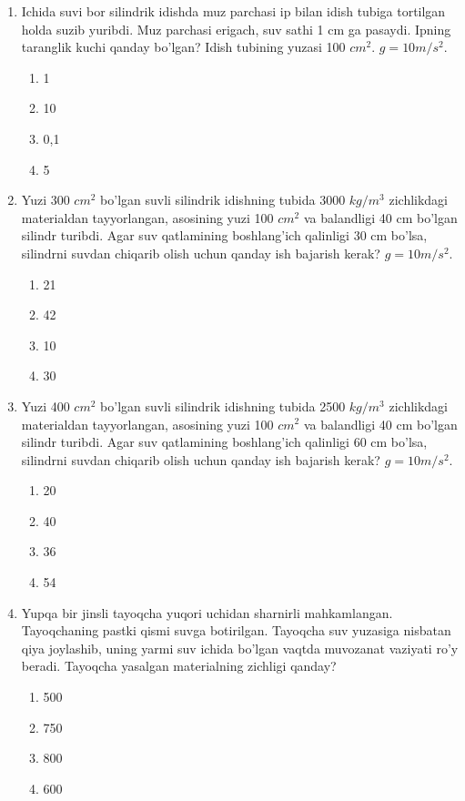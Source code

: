 \begin{enumerate}
\item Ichida suvi bor silindrik idishda muz parchasi ip bilan idish tubiga tortilgan holda suzib yuribdi. Muz parchasi erigach, suv sathi 1 cm ga pasaydi. Ipning taranglik kuchi qanday bo'lgan? Idish tubining yuzasi 100 $cm^2$. $g=10m/s^2$.
\begin{enumerate}[label=\Alph*)]
\item 1
\item 10
\item 0,1
\item 5
\end{enumerate}

\item Yuzi 300 $cm^2$ bo'lgan suvli silindrik idishning tubida 3000 $kg/m^3$ zichlikdagi materialdan tayyorlangan, asosining yuzi 100 $cm^2$ va balandligi 40 cm bo'lgan silindr turibdi. Agar suv qatlamining boshlang'ich qalinligi 30 cm bo'lsa, silindrni suvdan chiqarib olish uchun qanday ish bajarish kerak? $g=10m/s^2$.
\begin{enumerate}[label=\Alph*)]
\item 21
\item 42
\item 10
\item 30
\end{enumerate}

\item Yuzi 400 $cm^2$ bo'lgan suvli silindrik idishning tubida 2500 $kg/m^3$ zichlikdagi materialdan tayyorlangan, asosining yuzi 100 $cm^2$ va balandligi 40 cm bo'lgan silindr turibdi. Agar suv qatlamining boshlang'ich qalinligi 60 cm bo'lsa, silindrni suvdan chiqarib olish uchun qanday ish bajarish kerak? $g=10m/s^2$.
\begin{enumerate}[label=\Alph*)]
\item 20
\item 40
\item 36
\item 54
\end{enumerate}

\item Yupqa bir jinsli tayoqcha yuqori uchidan sharnirli mahkamlangan. Tayoqchaning pastki qismi suvga botirilgan. Tayoqcha suv yuzasiga nisbatan qiya joylashib, uning yarmi suv ichida bo'lgan vaqtda muvozanat vaziyati ro'y beradi. Tayoqcha yasalgan materialning zichligi qanday?
\begin{enumerate}[label=\Alph*)]
\item 500
\item 750
\item 800
\item 600
\end{enumerate}


\end{enumerate}
